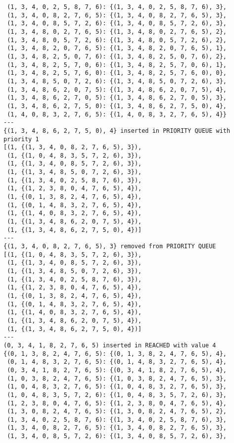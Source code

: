 \documentclass{article}
\begin{document}
\begin{verbatim}
 (1, 3, 4, 0, 2, 5, 8, 7, 6): {(1, 3, 4, 0, 2, 5, 8, 7, 6), 3},
 (1, 3, 4, 0, 8, 2, 7, 6, 5): {(1, 3, 4, 0, 8, 2, 7, 6, 5), 3},
 (1, 3, 4, 0, 8, 5, 7, 2, 6): {(1, 3, 4, 0, 8, 5, 7, 2, 6), 3},
 (1, 3, 4, 8, 0, 2, 7, 6, 5): {(1, 3, 4, 8, 0, 2, 7, 6, 5), 2},
 (1, 3, 4, 8, 0, 5, 7, 2, 6): {(1, 3, 4, 8, 0, 5, 7, 2, 6), 2},
 (1, 3, 4, 8, 2, 0, 7, 6, 5): {(1, 3, 4, 8, 2, 0, 7, 6, 5), 1},
 (1, 3, 4, 8, 2, 5, 0, 7, 6): {(1, 3, 4, 8, 2, 5, 0, 7, 6), 2},
 (1, 3, 4, 8, 2, 5, 7, 0, 6): {(1, 3, 4, 8, 2, 5, 7, 0, 6), 1},
 (1, 3, 4, 8, 2, 5, 7, 6, 0): {(1, 3, 4, 8, 2, 5, 7, 6, 0), 0},
 (1, 3, 4, 8, 5, 0, 7, 2, 6): {(1, 3, 4, 8, 5, 0, 7, 2, 6), 3},
 (1, 3, 4, 8, 6, 2, 0, 7, 5): {(1, 3, 4, 8, 6, 2, 0, 7, 5), 4},
 (1, 3, 4, 8, 6, 2, 7, 0, 5): {(1, 3, 4, 8, 6, 2, 7, 0, 5), 3},
 (1, 3, 4, 8, 6, 2, 7, 5, 0): {(1, 3, 4, 8, 6, 2, 7, 5, 0), 4},
 (1, 4, 0, 8, 3, 2, 7, 6, 5): {(1, 4, 0, 8, 3, 2, 7, 6, 5), 4}}
---
{(1, 3, 4, 8, 6, 2, 7, 5, 0), 4} inserted in PRIORITY QUEUE with priority 1
[(1, {(1, 3, 4, 0, 8, 2, 7, 6, 5), 3}),
 (1, {(1, 0, 4, 8, 3, 5, 7, 2, 6), 3}),
 (1, {(1, 3, 4, 0, 8, 5, 7, 2, 6), 3}),
 (1, {(1, 3, 4, 8, 5, 0, 7, 2, 6), 3}),
 (1, {(1, 3, 4, 0, 2, 5, 8, 7, 6), 3}),
 (1, {(1, 2, 3, 8, 0, 4, 7, 6, 5), 4}),
 (1, {(0, 1, 3, 8, 2, 4, 7, 6, 5), 4}),
 (1, {(0, 1, 4, 8, 3, 2, 7, 6, 5), 4}),
 (1, {(1, 4, 0, 8, 3, 2, 7, 6, 5), 4}),
 (1, {(1, 3, 4, 8, 6, 2, 0, 7, 5), 4}),
 (1, {(1, 3, 4, 8, 6, 2, 7, 5, 0), 4})]
---
{(1, 3, 4, 0, 8, 2, 7, 6, 5), 3} removed from PRIORITY QUEUE
[(1, {(1, 0, 4, 8, 3, 5, 7, 2, 6), 3}),
 (1, {(1, 3, 4, 0, 8, 5, 7, 2, 6), 3}),
 (1, {(1, 3, 4, 8, 5, 0, 7, 2, 6), 3}),
 (1, {(1, 3, 4, 0, 2, 5, 8, 7, 6), 3}),
 (1, {(1, 2, 3, 8, 0, 4, 7, 6, 5), 4}),
 (1, {(0, 1, 3, 8, 2, 4, 7, 6, 5), 4}),
 (1, {(0, 1, 4, 8, 3, 2, 7, 6, 5), 4}),
 (1, {(1, 4, 0, 8, 3, 2, 7, 6, 5), 4}),
 (1, {(1, 3, 4, 8, 6, 2, 0, 7, 5), 4}),
 (1, {(1, 3, 4, 8, 6, 2, 7, 5, 0), 4})]
---
(0, 3, 4, 1, 8, 2, 7, 6, 5) inserted in REACHED with value 4
{(0, 1, 3, 8, 2, 4, 7, 6, 5): {(0, 1, 3, 8, 2, 4, 7, 6, 5), 4},
 (0, 1, 4, 8, 3, 2, 7, 6, 5): {(0, 1, 4, 8, 3, 2, 7, 6, 5), 4},
 (0, 3, 4, 1, 8, 2, 7, 6, 5): {(0, 3, 4, 1, 8, 2, 7, 6, 5), 4},
 (1, 0, 3, 8, 2, 4, 7, 6, 5): {(1, 0, 3, 8, 2, 4, 7, 6, 5), 3},
 (1, 0, 4, 8, 3, 2, 7, 6, 5): {(1, 0, 4, 8, 3, 2, 7, 6, 5), 3},
 (1, 0, 4, 8, 3, 5, 7, 2, 6): {(1, 0, 4, 8, 3, 5, 7, 2, 6), 3},
 (1, 2, 3, 8, 0, 4, 7, 6, 5): {(1, 2, 3, 8, 0, 4, 7, 6, 5), 4},
 (1, 3, 0, 8, 2, 4, 7, 6, 5): {(1, 3, 0, 8, 2, 4, 7, 6, 5), 2},
 (1, 3, 4, 0, 2, 5, 8, 7, 6): {(1, 3, 4, 0, 2, 5, 8, 7, 6), 3},
 (1, 3, 4, 0, 8, 2, 7, 6, 5): {(1, 3, 4, 0, 8, 2, 7, 6, 5), 3},
 (1, 3, 4, 0, 8, 5, 7, 2, 6): {(1, 3, 4, 0, 8, 5, 7, 2, 6), 3},

\end{verbatim}
\end{document}
